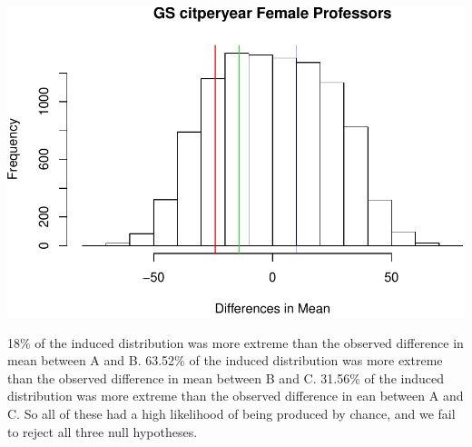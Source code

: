 \documentclass[]{article}
\newenvironment{Shaded}{\begin{snugshade}}{\end{snugshade}}
\newcommand{\DataTypeTok}[1]{\textcolor[rgb]{0.13,0.29,0.53}{#1}}
\newcommand{\DecValTok}[1]{\textcolor[rgb]{0.00,0.00,0.81}{#1}}
\newcommand{\KeywordTok}[1]{\textcolor[rgb]{0.13,0.29,0.53}{\textbf{#1}}}
\newcommand{\NormalTok}[1]{#1}
\newcommand{\OperatorTok}[1]{\textcolor[rgb]{0.81,0.36,0.00}{\textbf{#1}}}
\newcommand{\StringTok}[1]{\textcolor[rgb]{0.31,0.60,0.02}{#1}}
\begin{document}
\begin{Shaded}
\end{Shaded}

\includegraphics{final_files/figure-latex/unnamed-chunk-76-1.pdf}

18\% of the induced distribution was more extreme than the observed
difference in mean between A and B. 63.52\% of the induced distribution
was more extreme than the observed difference in mean between B and C.
31.56\% of the induced distribution was more extreme than the observed
difference in ean between A and C. So all of these had a high likelihood
of being produced by chance, and we fail to reject all three null
hypotheses.
\end{document}
